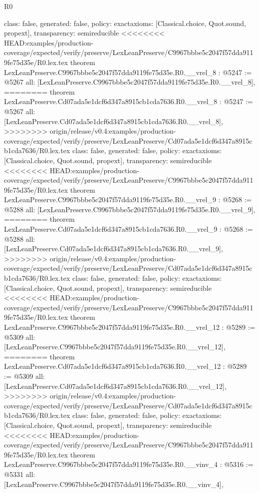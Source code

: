 \begin{lexlean}{R0}
\begin{coremodule}
{{{{{{{{{{{{{{{{{{{{{{{{{{{{{{{{{{{{{{{{{{{{{{{{{{{{{{{{{{{{{{{{{{{{{{{  class: false,
  generated: false,
  policy: exact{axioms: [Classical.choice, Quot.sound, propext]},
  transparency: semireducible
}
<<<<<<<< HEAD:examples/production-coverage/expected/verify/preserve/LexLeanPreserve/C9967bbbe5c2047f57dda9119fe75d35e/R0.lex.tex
theorem LexLeanPreserve.C9967bbbe5c2047f57dda9119fe75d35e.R0.__vrel_8 : @5247 := @5267 {
  all: [LexLeanPreserve.C9967bbbe5c2047f57dda9119fe75d35e.R0.__vrel_8],
========
theorem LexLeanPreserve.Cd07ada5e1dcf6d347a8915cb1cda7636.R0.__vrel_8 : @5247 := @5267 {
  all: [LexLeanPreserve.Cd07ada5e1dcf6d347a8915cb1cda7636.R0.__vrel_8],
>>>>>>>> origin/release/v0.4:examples/production-coverage/expected/verify/preserve/LexLeanPreserve/Cd07ada5e1dcf6d347a8915cb1cda7636/R0.lex.tex
  class: false,
  generated: false,
  policy: exact{axioms: [Classical.choice, Quot.sound, propext]},
  transparency: semireducible
}
<<<<<<<< HEAD:examples/production-coverage/expected/verify/preserve/LexLeanPreserve/C9967bbbe5c2047f57dda9119fe75d35e/R0.lex.tex
theorem LexLeanPreserve.C9967bbbe5c2047f57dda9119fe75d35e.R0.__vrel_9 : @5268 := @5288 {
  all: [LexLeanPreserve.C9967bbbe5c2047f57dda9119fe75d35e.R0.__vrel_9],
========
theorem LexLeanPreserve.Cd07ada5e1dcf6d347a8915cb1cda7636.R0.__vrel_9 : @5268 := @5288 {
  all: [LexLeanPreserve.Cd07ada5e1dcf6d347a8915cb1cda7636.R0.__vrel_9],
>>>>>>>> origin/release/v0.4:examples/production-coverage/expected/verify/preserve/LexLeanPreserve/Cd07ada5e1dcf6d347a8915cb1cda7636/R0.lex.tex
  class: false,
  generated: false,
  policy: exact{axioms: [Classical.choice, Quot.sound, propext]},
  transparency: semireducible
}
<<<<<<<< HEAD:examples/production-coverage/expected/verify/preserve/LexLeanPreserve/C9967bbbe5c2047f57dda9119fe75d35e/R0.lex.tex
theorem LexLeanPreserve.C9967bbbe5c2047f57dda9119fe75d35e.R0.__vrel_12 : @5289 := @5309 {
  all: [LexLeanPreserve.C9967bbbe5c2047f57dda9119fe75d35e.R0.__vrel_12],
========
theorem LexLeanPreserve.Cd07ada5e1dcf6d347a8915cb1cda7636.R0.__vrel_12 : @5289 := @5309 {
  all: [LexLeanPreserve.Cd07ada5e1dcf6d347a8915cb1cda7636.R0.__vrel_12],
>>>>>>>> origin/release/v0.4:examples/production-coverage/expected/verify/preserve/LexLeanPreserve/Cd07ada5e1dcf6d347a8915cb1cda7636/R0.lex.tex
  class: false,
  generated: false,
  policy: exact{axioms: [Classical.choice, Quot.sound, propext]},
  transparency: semireducible
}
<<<<<<<< HEAD:examples/production-coverage/expected/verify/preserve/LexLeanPreserve/C9967bbbe5c2047f57dda9119fe75d35e/R0.lex.tex
theorem LexLeanPreserve.C9967bbbe5c2047f57dda9119fe75d35e.R0.__vinv_4 : @5316 := @5331 {
  all: [LexLeanPreserve.C9967bbbe5c2047f57dda9119fe75d35e.R0.__vinv_4],
}}}}}}}}}}}}}}}}}}}}}}}}}}}}}}}}}}}}}}}}}}}}}}}}}}}}}}}}}}}}}}}}}}}}}}}}}}
\end{coremodule}
\end{lexlean}
